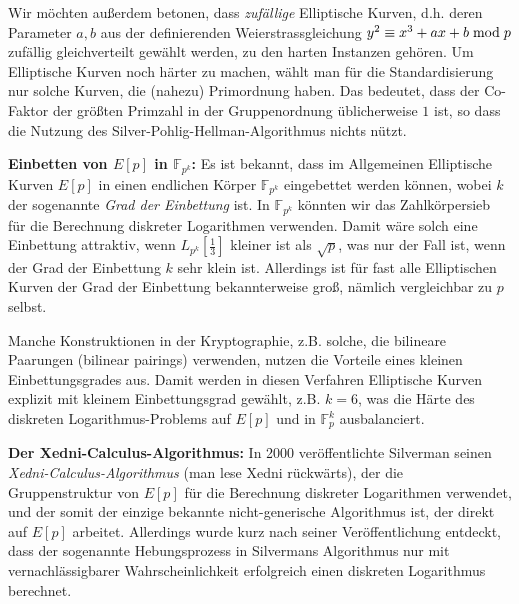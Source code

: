 \begin{refsegment}
Wir möchten außerdem betonen, dass {\em zufällige} Elliptische Kurven, d.h. deren Parameter $a,b$ aus der definierenden Weierstrassgleichung $y^2 \equiv x^3+ax+b \hspace{1mm}{\rm mod}\hspace{1mm} p$ zufällig gleichverteilt
gewählt werden, zu den harten Instanzen gehören. Um Elliptische Kurven noch härter zu machen, wählt man für die Standardisierung nur solche Kurven, die (nahezu) Primordnung haben. Das bedeutet, dass der Co-Faktor der größten Primzahl in der Gruppenordnung üblicherweise $1$ ist, so dass die Nutzung des Silver-Pohlig-Hellman-Algorithmus nichts nützt.

\textbf{Einbetten von $E[p]$ in $\mathbb{F}_{p^k}$:}
Es ist bekannt, dass im Allgemeinen Elliptische Kurven $E[p]$ in einen endlichen Körper $\mathbb{F}_{p^k}$ eingebettet werden können, wobei $k$ der sogenannte {\em Grad der Einbettung} ist. In $\mathbb{F}_{p^k}$ könnten wir das Zahlkörpersieb für die Berechnung diskreter Logarithmen verwenden. Damit wäre solch eine Einbettung attraktiv, wenn $L_{p^k}[\frac 1 3]$ kleiner ist als $\sqrt p$, was nur der Fall ist, wenn der Grad der Einbettung $k$ sehr klein ist. Allerdings ist für fast alle Elliptischen Kurven der Grad der Einbettung bekannterweise groß, nämlich vergleichbar zu $p$ selbst.

Manche Konstruktionen in der Kryptographie, z.B. solche, die bilineare Paarungen (bilinear pairings) verwenden, nutzen die Vorteile eines kleinen Einbettungsgrades aus. Damit werden in diesen Verfahren Elliptische Kurven explizit mit kleinem Einbettungsgrad gewählt, z.B. $k=6$, was die Härte des diskreten Logarithmus-Problems auf $E[p]$ und in $\mathbb{F}_p^k$ ausbalanciert.

\textbf{Der Xedni-Calculus-Algorithmus:}
In 2000 veröffentlichte Silverman seinen {\em Xedni-Calculus-Algorithmus} (man lese Xedni rückwärts), der die Gruppenstruktur von $E[p]$ für die Berechnung diskreter Logarithmen verwendet, und der somit der einzige bekannte nicht-generische Algorithmus ist, der direkt auf $E[p]$ arbeitet. Allerdings wurde kurz nach seiner Veröffentlichung entdeckt, dass der sogenannte Hebungsprozess in Silvermans Algorithmus nur mit vernachlässigbarer Wahrscheinlichkeit erfolgreich einen diskreten Logarithmus berechnet.




\end{refsegment}
